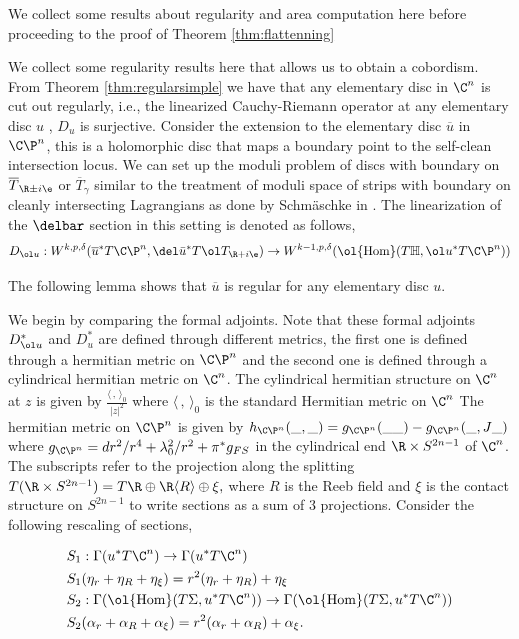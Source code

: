 We collect some results about regularity and area computation here before proceeding to the proof of Theorem \ref{thm:flattenning}

 \begin{remark} 
We collect some regularity results here that allows us to obtain a cobordism. From Theorem \ref{thm:regularsimple} we have that any elementary disc in $\C^n$ is cut out regularly, i.e., the linearized Cauchy-Riemann operator at any elementary disc $u$ ,  $D_u$ is surjective. Consider the extension to the elementary disc $\overline{u}$ in $\C\P^n$, this is a holomorphic disc that maps a boundary point to the self-clean intersection locus. We can set up the moduli problem of discs with boundary on $\overline T_{\R \pm i\e}$ or $\overline T_\gamma$ similar to the treatment of moduli space of strips with boundary on cleanly intersecting Lagrangians as done by Schm\"aschke in \cite{schm}. The linearization of the $\delbar$ section in this setting is denoted as follows,$$ D_{\ol u}: W^{k,p,\delta }(\overline{u}^*T\C\P^n, \del \bar u ^* T \ol T_{\R+i\e} ) \to  W^{k-1,p,\delta } (\ol {\operatorname{Hom}} (T\mathbb{H},\ol u ^* T\C\P^n ))  $$

The following lemma shows that $\overline{u}$ is regular for any elementary disc $u$.

We begin by comparing the formal adjoints. Note that these formal adjoints $D_{\ol u}^*$  and $D^*_{u}$ are defined through different metrics, the first one is defined through a hermitian metric on $\C\P^n$ and the second one is defined through a cylindrical hermitian metric on $\C^n$. The cylindrical hermitian structure on $\C^n$ at $z$ is given by $\frac{\langle \,,\,\rangle_{0}}{|z|^2}$ where $\langle\,,\, \rangle_0$ is the standard Hermitian metric on $\C^n$  The hermitian metric on $\C\P^n$ is given by $h_{\C\P^n}(\_,\_) = g_{\C\P^n} (\_\_) - g_{\C\P^n} (\_,J\_) $
where $g_{\C\P^n} = dr^2/r^4 + \lambda_0^2/r^2 + \pi^*g_{FS}$ in the cylindrical end $\R \times S^{2n-1}$ of $\C^n$. The subscripts refer to the projection along the  splitting $T(\R \times S^{2n-1}) = T\R \oplus \R \langle R \rangle \oplus \xi,$ where $R$ is the Reeb field and $\xi$ is the contact structure on $S^{2n-1}$ to write sections as a sum of 3 projections. Consider the following rescaling of sections, 

\begin{align*}
    \label{eq:rescale}
    &S_1 : \Gamma (u^*T\C^n) \to \Gamma (u^*T\C^n)\\
    &S_1(\eta_r + \eta_R + \eta_{\xi}) = r^2(\eta_r + \eta_R) + \eta_\xi\\
    &S_2 : \Gamma(\ol{\operatorname{Hom}}(T\Sigma, u^*T\C^n)) \to \Gamma(\ol{\operatorname{Hom}}(T\Sigma, u^*T\C^n)) \\
    &S_2(\alpha_{r} + \alpha_{R} + \alpha_{\xi}) = r^2(\alpha_r + \alpha_R ) + \alpha_{\xi}.
\end{align*}


\end{remark}
